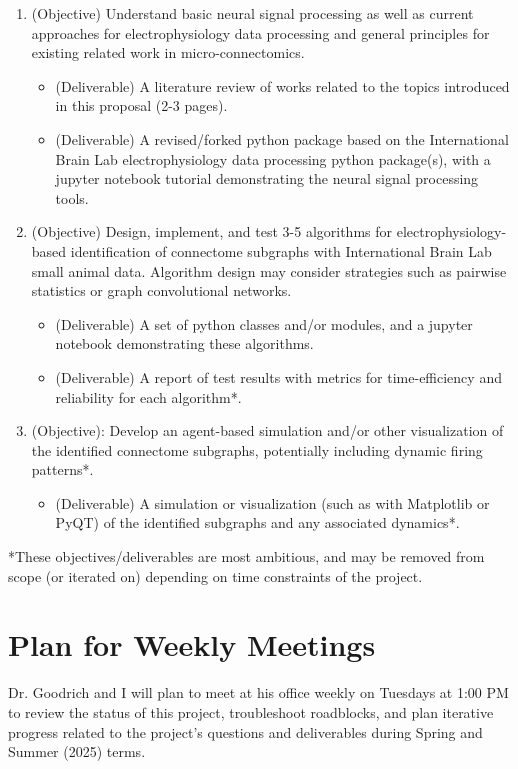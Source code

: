 \documentclass[11pt]{article}
\newcommand{\sectionwithindent}[1]{%
    \section*{#1}%
    \hspace{\parindent} %
}
\begin{document}
\begin{enumerate}
    \item (Objective) Understand basic neural signal processing as well as current approaches for electrophysiology data processing and general principles for existing related work in micro-connectomics.
    \begin{itemize}
        \item (Deliverable) A literature review of works related to the topics introduced in this proposal (2-3 pages).
        \item (Deliverable) A revised/forked python package based on the International Brain Lab electrophysiology data processing python package(s), with a jupyter notebook tutorial demonstrating the neural signal processing tools.
    \end{itemize}
    
    \item (Objective) Design, implement, and test 3-5 algorithms for electrophysiology-based identification of connectome subgraphs with International Brain Lab small animal data. Algorithm design may consider strategies such as pairwise statistics or graph convolutional networks.
    \begin{itemize}
        \item (Deliverable) A set of python classes and/or modules, and a jupyter notebook demonstrating these algorithms.
        \item (Deliverable) A report of test results with metrics for time-efficiency and reliability for each algorithm*.
    \end{itemize}
    
    \item (Objective): Develop an agent-based simulation and/or other visualization of the identified connectome subgraphs, potentially including dynamic firing patterns*.
    \begin{itemize}
        \item (Deliverable) A simulation or visualization (such as with Matplotlib or PyQT) of the identified subgraphs and any associated dynamics*.
    \end{itemize}
\end{enumerate}
*These objectives/deliverables are most ambitious, and may be removed from scope (or iterated on) depending on time constraints of the project.

\sectionwithindent{Plan for Weekly Meetings}
Dr. Goodrich and I will plan to meet at his office weekly on Tuesdays at 1:00 PM to review the status of this project, troubleshoot roadblocks, and plan iterative progress related to the project's questions and deliverables during Spring and Summer (2025) terms.
\end{document}
